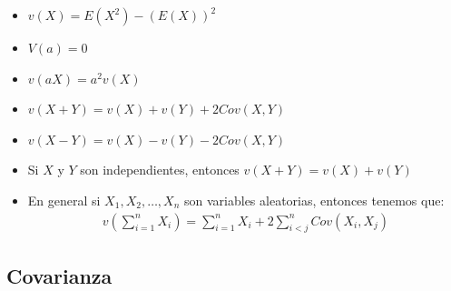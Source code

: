 \documentclass[12pt, fleqn]{report}                             %
\theoremstyle{break}                                            %
\newcommand{\Wrap}[1]{\left( #1 \right)}                        %
\begin{document}
                    \begin{itemize}

                        \item
                            $v(X) = E(X^2) - (E(X))^2$

                        \item 
                            $V(a) = 0$

                        \item 
                            $v(aX) = a^2 v(X)$


                        \item 
                            $v(X + Y) = v(X) + v(Y) + 2Cov(X,Y)$

                        \item 
                            $v(X - Y) = v(X) - v(Y) - 2Cov(X,Y)$
                                

                        \item
                            Si $X$ y $Y$ son independientes, entonces $v(X + Y) = v(X) + v(Y)$


                        \item
                            En general si $X_1, X_2, \dots, X_n$ son variables aleatorias, entonces
                            tenemos que:
                            \begin{align*}
                                v\Wrap{\sum_{i = 1}^n X_i} = \sum_{i = 1}^n X_i + 2\sum_{i < j}^n Cov(X_i, X_j)
                            \end{align*}

                    \end{itemize}
                                


            \clearpage
            \subsection{Covarianza}

\end{document}
